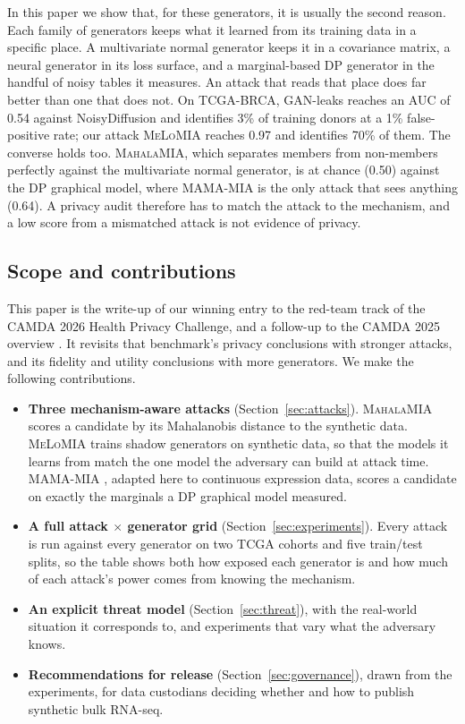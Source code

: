 \documentclass[webpdf,contemporary,large]{oup-authoring-template}
\newcommand{\mahala}{\textsc{MahalaMIA}}
\newcommand{\melo}{\textsc{MeLoMIA}}
\newcommand{\mama}{\textsc{MAMA-MIA}}
\begin{document}
In this paper we show that, for these generators, it is usually the second reason. Each family of generators keeps what it learned from its training data in a specific place. A multivariate normal generator keeps it in a covariance matrix, a neural generator in its loss surface, and a marginal-based DP generator in the handful of noisy tables it measures. An attack that reads that place does far better than one that does not. On TCGA-BRCA, GAN-leaks reaches an AUC of 0.54 against NoisyDiffusion and identifies 3\% of training donors at a 1\% false-positive rate; our attack \melo{} reaches 0.97 and identifies 70\% of them. The converse holds too. \mahala{}, which separates members from non-members perfectly against the multivariate normal generator, is at chance (0.50) against the DP graphical model, where \mama{} is the only attack that sees anything (0.64). A privacy audit therefore has to match the attack to the mechanism, and a low score from a mismatched attack is not evidence of privacy.

\subsection{Scope and contributions}
\label{sec:scope}

This paper is the write-up of our winning entry to the red-team track of the CAMDA 2026 Health Privacy Challenge, and a follow-up to the CAMDA 2025 overview \citep{ozturk2026towards}. It revisits that benchmark's privacy conclusions with stronger attacks, and its fidelity and utility conclusions with more generators. We make the following contributions.

\begin{itemize}
  \item \textbf{Three mechanism-aware attacks} (Section~\ref{sec:attacks}). \mahala{} scores a candidate by its Mahalanobis distance to the synthetic data. \melo{} trains shadow generators on synthetic data, so that the models it learns from match the one model the adversary can build at attack time. \mama{} \citep{golob_privacy_2025}, adapted here to continuous expression data, scores a candidate on exactly the marginals a DP graphical model measured.
  \item \textbf{A full attack $\times$ generator grid} (Section~\ref{sec:experiments}). Every attack is run against every generator on two TCGA cohorts and five train/test splits, so the table shows both how exposed each generator is and how much of each attack's power comes from knowing the mechanism.
  \item \textbf{An explicit threat model} (Section~\ref{sec:threat}), with the real-world situation it corresponds to, and experiments that vary what the adversary knows.
  \item \textbf{Recommendations for release} (Section~\ref{sec:governance}), drawn from the experiments, for data custodians deciding whether and how to publish synthetic bulk RNA-seq.
\end{itemize}
\end{document}
